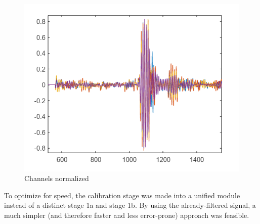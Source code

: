 \begin{figure}[H]
    \centering
    \includegraphics[width=0.5\linewidth]{figures/channels_normed.PNG}
    \caption{Channels normalized}
\end{figure}

To optimize for speed, the calibration stage was made into a unified module instead of a distinct stage 1a and
 stage 1b. By using the already-filtered signal, a much simpler (and therefore faster and less error-prone)
 approach was feasible. 

